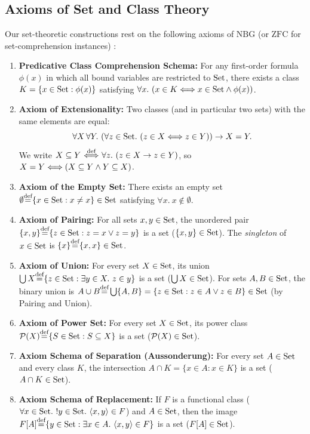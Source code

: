 \documentclass[10pt,a4paper]{article}
\begin{document}
\subsection{Axioms of Set and Class Theory}\label{sec:axioms}
Our set-theoretic constructions rest on the following axioms of $\mathrm{NBG}$ (or $\mathrm{ZFC}$ for set-comprehension instances) \cite{Godel1940,Bernays1958,TakeutiZaring1982,Mendelson2015}:
\begin{enumerate}
\item \textbf{Predicative Class Comprehension Schema:} For any first-order formula $\phi(x)$ in which all bound variables are restricted to ${\textrm{Set}}$, there exists a class $K = \{x \in {\textrm{Set}} : \phi(x)\}$ satisfying $\forall x.\ (x \in K \Longleftrightarrow x \in {\textrm{Set}} \land \phi(x))$.
\item \textbf{Axiom of Extensionality:} Two classes (and in particular two sets) with the same elements are equal:
$$\forall X\, \forall Y.\ (\forall z \in {\textrm{Set}}.\ (z \in X \Longleftrightarrow z \in Y)) \to X = Y.$$
We write $X \subseteq Y {\stackrel{{\textrm{def}}}{\ \Longleftrightarrow\ }} \forall z.\ (z \in X \to z \in Y)$, so $X = Y \Longleftrightarrow (X \subseteq Y \land Y \subseteq X)$.
\item \textbf{Axiom of the Empty Set:} There exists an empty set $\emptyset {\stackrel{{\textrm{def}}}{=}} \{x \in {\textrm{Set}} : x \neq x\} \in {\textrm{Set}}$ satisfying $\forall x.\ x \notin \emptyset$.
\item \textbf{Axiom of Pairing:} For all sets $x, y \in {\textrm{Set}}$, the unordered pair $\{x, y\} {\stackrel{{\textrm{def}}}{=}} \{z \in {\textrm{Set}} : z = x \lor z = y\}$ is a set ($\{x, y\} \in {\textrm{Set}}$). The \emph{singleton} of $x \in {\textrm{Set}}$ is $\{x\} {\stackrel{{\textrm{def}}}{=}} \{x, x\} \in {\textrm{Set}}$.
\item \textbf{Axiom of Union:} For every set $X \in {\textrm{Set}}$, its union $\bigcup X {\stackrel{{\textrm{def}}}{=}} \{z \in {\textrm{Set}} : \exists y \in X.\ z \in y\}$ is a set ($\bigcup X \in {\textrm{Set}}$). For sets $A, B \in {\textrm{Set}}$, the binary union is $A \cup B {\stackrel{{\textrm{def}}}{=}} \bigcup \{A, B\} = \{z \in {\textrm{Set}} : z \in A \lor z \in B\} \in {\textrm{Set}}$ (by Pairing and Union).
\item \textbf{Axiom of Power Set:} For every set $X \in {\textrm{Set}}$, its power class ${\mathcal{P}}(X) {\stackrel{{\textrm{def}}}{=}} \{S \in {\textrm{Set}} : S \subseteq X\}$ is a set (${\mathcal{P}}(X) \in {\textrm{Set}}$).
\item \textbf{Axiom Schema of Separation (Aussonderung):} For every set $A \in {\textrm{Set}}$ and every class $K$, the intersection $A \cap K = \{x \in A : x \in K\}$ is a set ($A \cap K \in {\textrm{Set}}$).
\item \textbf{Axiom Schema of Replacement:} If $F$ is a functional class ($\forall x \in \Set.\ !y \in \Set.\ \langle x, y \rangle \in F$) and $A \in {\textrm{Set}}$, then the image $F[A] \eqdef \{y \in \Set : \exists x \in A.\ \langle x, y \rangle \in F\}$ is a set ($F[A] \in {\textrm{Set}}$).

\end{enumerate}
\end{document}
